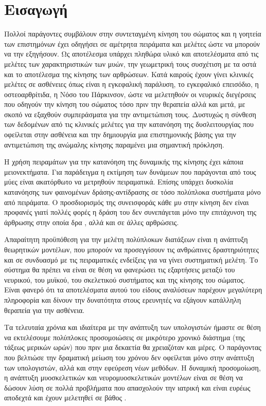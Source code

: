 \chapter{Εισαγωγή}

Πολλοί παράγοντες συμβάλουν στην συντεταγμένη κίνηση του σώματος και η γοητεία των επιστημόνων έχει οδηγήσει σε αμέτρητα πειράματα και μελέτες ώστε να μπορούν να την εξηγήσουν. Ως αποτέλεσμα υπάρχει πληθώρα υλικό και αποτελέσματα από τις μελέτες των χαρακτηριστικών των μυών, την γεωμετρική τους συσχέτιση με τα οστά και το αποτέλεσμα της κίνησης των αρθρώσεων. Κατά καιρούς έχουν γίνει κλινικές μελέτες σε ασθένειες όπως είναι η εγκεφαλική παράλυση, το εγκεφαλικό επεισόδιο, η οστεοαρθρίτιδα, η Νόσο του Πάρκινσον, ώστε να μελετηθούν οι νευρικές διεγέρσεις που οδηγούν την κίνηση του σώματος τόσο πριν την θεραπεία αλλά και μετά, με σκοπό να εξαχθούν συμπεράσματα για την αντιμετώπιση τους. Δυστυχώς η σύνθεση των δεδομένων από τις κλινικές μελέτες για την κατανόηση της δυσλειτουργίας που οφείλεται στην ασθένεια και την δημιουργία μια επιστημονικής βάσης για την αντιμετώπιση της ανώμαλης κίνησης παραμένει μια σημαντική πρόκληση.

Η χρήση πειραμάτων για την κατανόηση της δυναμικής της κίνησης έχει κάποια μειονεκτήματα. Για παράδειγμα η εκτίμηση των δυνάμεων που παράγονται από τους μύες είναι ακατόρθωτο να μετρηθούν πειραματικά. Επίσης υπάρχει δυσκολία κατανόησης των φαινομένων δράσης-αντίδρασης σε τόσο πολύπλοκα συστήματα μόνο από πειράματα. Ο προσδιορισμός της συνεισφοράς κάθε μυ στην κίνηση δεν είναι προφανές γιατί πολλές φορές η δράση του δεν συνεπάγεται μόνο την επιτάχυνση της άρθρωσης στην οποία δρα \cite{zajac-gordon89}, αλλά και σε άλλες αρθρώσεις.

Απαραίτητη προϋπόθεση για την μελέτη πολύπλοκων διατάξεων είναι η ανάπτυξη θεωρητικών μοντέλων, που μπορούν να προσεγγίσουν τις ανθρώπινες δραστηριότητες και σε συνδυασμό με τις πειραματικές ενδείξεις για να γίνει συστηματική μελέτη. Το σύστημα θα πρέπει να είναι σε θέση να φανερώσει τις εξαρτήσεις μεταξύ του νευρικού, του μυϊκού, του σκελετικού συστήματος και της κίνησης του σώματος. Είναι φανερό ότι τα αποτελέσματα αυτού του είδους αναλύσεων παρέχουν μεγαλύτερη πληροφορία και δίνουν την δυνατότητα στους ερευνητές να εξάγουν κατάλληλη θεραπεία για την ασθένεια.

Τα τελευταία χρόνια και ιδιαίτερα με την ανάπτυξη των υπολογιστών ήμαστε σε θέση να εκτελέσουμε πολύπλοκες προσομοιώσεις σε μικρότερο χρονικό διάστημα (της τάξεως μερικών ωρών) που πριν μια δεκαετία θα χρειαζόταν και μέρες. Ο παράγοντας που βελτιώσε την δραματική μείωση του χρόνου δεν οφείλεται μόνο στην ανάπτυξη των υπολογιστών, αλλά και στην εφεύρεση νέων μεθόδων. Η δυναμική προσομοίωση, η ανάπτυξη μυοσκελετικών και νευρομυοσκελετικών μοντέλων είναι σε θέση να δώσουν λύση σε πολλά προβλήματα που απασχολούν την ιατρική και είναι ευρέως αποδεχτά και έχουν μελετηθεί σε βάθος \cite{thelen-chumanov06, piazza06, pandy01, zajac02}.

